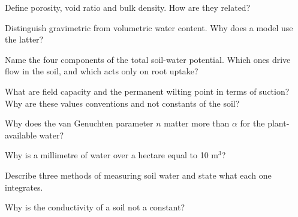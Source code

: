 \begin{exlist}
\item Define porosity, void ratio and bulk density. How are they related?
\item Distinguish gravimetric from volumetric water content. Why does a model use the latter?
\item Name the four components of the total soil-water potential. Which ones drive flow in the soil, and which acts only on root uptake?
\item What are field capacity and the permanent wilting point in terms of suction? Why are these values conventions and not constants of the soil?
\item Why does the van Genuchten parameter $n$ matter more than $\alpha$ for the plant-available water?
\item Why is a millimetre of water over a hectare equal to 10 m$^3$?
\item Describe three methods of measuring soil water and state what each one integrates.
\item Why is the conductivity of a soil not a constant?
\end{exlist}

